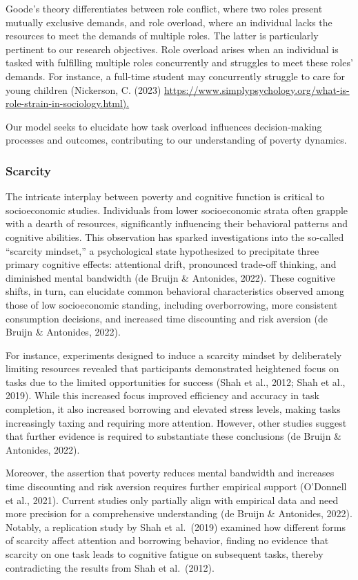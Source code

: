 \documentclass[
]{article}
\begin{document}
Goode's theory differentiates between role conflict, where two roles
present mutually exclusive demands, and role overload, where an
individual lacks the resources to meet the demands of multiple roles.
The latter is particularly pertinent to our research objectives. Role
overload arises when an individual is tasked with fulfilling multiple
roles concurrently and struggles to meet these roles' demands. For
instance, a full-time student may concurrently struggle to care for
young children (Nickerson, C. (2023)
\url{https://www.simplypsychology.org/what-is-role-strain-in-sociology.html).}

Our model seeks to elucidate how task overload influences
decision-making processes and outcomes, contributing to our
understanding of poverty dynamics.

\hypertarget{scarcity}{%
\subsubsection{Scarcity}\label{scarcity}}

The intricate interplay between poverty and cognitive function is
critical to socioeconomic studies. Individuals from lower socioeconomic
strata often grapple with a dearth of resources, significantly
influencing their behavioral patterns and cognitive abilities. This
observation has sparked investigations into the so-called ``scarcity
mindset,'' a psychological state hypothesized to precipitate three
primary cognitive effects: attentional drift, pronounced trade-off
thinking, and diminished mental bandwidth (de Bruijn \& Antonides,
2022). These cognitive shifts, in turn, can elucidate common behavioral
characteristics observed among those of low socioeconomic standing,
including overborrowing, more consistent consumption decisions, and
increased time discounting and risk aversion (de Bruijn \& Antonides,
2022).

For instance, experiments designed to induce a scarcity mindset by
deliberately limiting resources revealed that participants demonstrated
heightened focus on tasks due to the limited opportunities for success
(Shah et al., 2012; Shah et al., 2019). While this increased focus
improved efficiency and accuracy in task completion, it also increased
borrowing and elevated stress levels, making tasks increasingly taxing
and requiring more attention. However, other studies suggest that
further evidence is required to substantiate these conclusions (de
Bruijn \& Antonides, 2022).

Moreover, the assertion that poverty reduces mental bandwidth and
increases time discounting and risk aversion requires further empirical
support (O'Donnell et al., 2021). Current studies only partially align
with empirical data and need more precision for a comprehensive
understanding (de Bruijn \& Antonides, 2022). Notably, a replication
study by Shah et al.~(2019) examined how different forms of scarcity
affect attention and borrowing behavior, finding no evidence that
scarcity on one task leads to cognitive fatigue on subsequent tasks,
thereby contradicting the results from Shah et al.~(2012).
\end{document}
